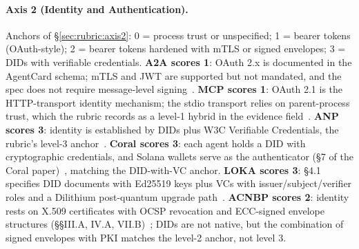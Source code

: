 \paragraph{Axis 2 (Identity and Authentication).}
Anchors of \S\ref{sec:rubric:axis2}: 0 = process trust or
unspecified; 1 = bearer tokens (OAuth-style); 2 = bearer
tokens hardened with mTLS or signed envelopes; 3 = DIDs
with verifiable credentials. \textbf{A2A scores 1}: OAuth
2.x is documented in the AgentCard schema; mTLS and JWT
are supported but not mandated, and the spec does not
require message-level signing~\cite{spec_a2a, a2a_weaknesses}.
\textbf{MCP scores 1}: OAuth 2.1 is the HTTP-transport
identity mechanism; the stdio transport relies on
parent-process trust, which the rubric records as a
level-1 hybrid in the evidence field~\cite{spec_mcp}.
\textbf{ANP scores 3}: identity is established by DIDs
plus W3C Verifiable Credentials, the rubric's level-3
anchor~\cite{spec_anp}. \textbf{Coral scores 3}: each
agent holds a DID with cryptographic credentials, and
Solana wallets serve as the authenticator (\S7 of the
Coral paper)~\cite{spec_coral}, matching the
DID-with-VC anchor. \textbf{LOKA scores 3}: \S4.1
specifies DID documents with Ed25519 keys plus VCs with
issuer/subject/verifier roles and a Dilithium post-quantum
upgrade path~\cite{spec_loka}. \textbf{ACNBP scores 2}:
identity rests on X.509 certificates with OCSP revocation
and ECC-signed envelope structures (\S\S III.A, IV.A,
VII.B)~\cite{spec_acnbp}; DIDs are not native, but the
combination of signed envelopes with PKI matches the
level-2 anchor, not level 3.

